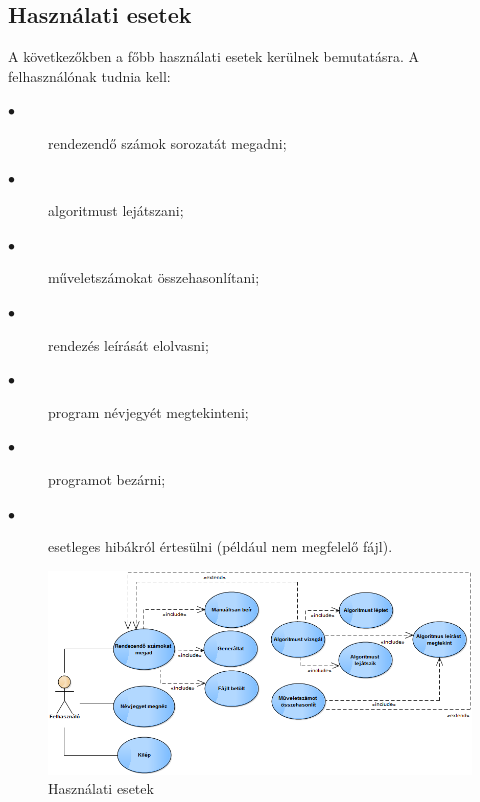 \documentclass{elteikthesis}
\begin{document}
\subsection{Használati esetek}
A következőkben a főbb használati esetek kerülnek bemutatásra. A felhasználónak tudnia kell:\par
\begin{description}
	\item[$\bullet$] rendezendő számok sorozatát megadni;
	\item[$\bullet$] algoritmust lejátszani;
	\item[$\bullet$] műveletszámokat összehasonlítani;
	\item[$\bullet$] rendezés leírását elolvasni;
	\item[$\bullet$] program névjegyét megtekinteni;
	\item[$\bullet$] programot bezárni;
	\item[$\bullet$] esetleges hibákról értesülni (például nem megfelelő fájl).
\end{description}
\begin{figure}[H]
	\centering
	\includegraphics[width=\textwidth]{pics/usecase.png}
	\caption{Használati esetek}
\end{figure}\par
\end{document}
